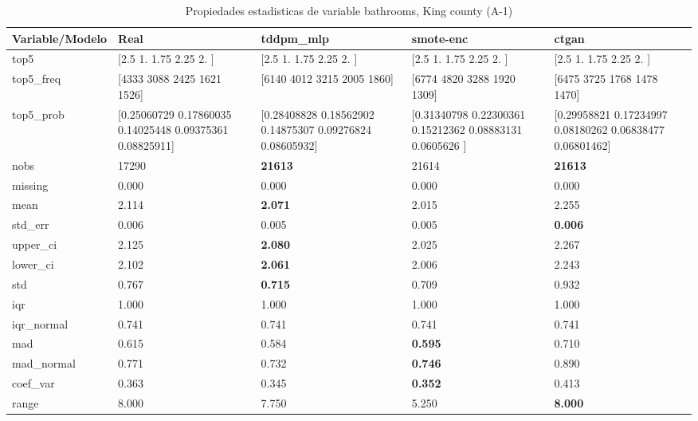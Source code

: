 \begin{table}[H]
\centering
\fontsize{8}{14}\selectfont
\caption{Propiedades  estadisticas de variable bathrooms, King county (A-1)}
\label{table-stats-king county-a-1-bathrooms}
\begin{tabular}{|l|m{10em}|m{10em}|m{10em}|m{10em}|}
\hline
 \rowcolor[gray]{0.8}
Variable/Modelo & Real & tddpm\_mlp & smote-enc & ctgan \\
\hline top5 & [2.5  1.   1.75 2.25 2.  ] & [2.5  1.   1.75 2.25 2.  ] & [2.5  1.   1.75 2.25 2.  ] & [2.5  1.   1.75 2.25 2.  ] \\
\hline top5\_freq & [4333 3088 2425 1621 1526] & [6140 4012 3215 2005 1860] & [6774 4820 3288 1920 1309] & [6475 3725 1768 1478 1470] \\
\hline top5\_prob & [0.25060729 0.17860035 0.14025448 0.09375361 0.08825911] & [0.28408828 0.18562902 0.14875307 0.09276824 0.08605932] & [0.31340798 0.22300361 0.15212362 0.08883131 0.0605626 ] & [0.29958821 0.17234997 0.08180262 0.06838477 0.06801462] \\
\hline nobs & 17290 & \bfseries 21613 & \cellcolor[rgb]{0.9, 0.54, 0.52} 21614 & \bfseries 21613 \\
\hline missing & 0.000 & 0.000 & 0.000 & 0.000 \\
\hline mean & 2.114 & \bfseries 2.071 & 2.015 & \cellcolor[rgb]{0.9, 0.54, 0.52} 2.255 \\
\hline std\_err & 0.006 & 0.005 & \cellcolor[rgb]{0.9, 0.54, 0.52} 0.005 & \bfseries 0.006 \\
\hline upper\_ci & 2.125 & \bfseries 2.080 & 2.025 & \cellcolor[rgb]{0.9, 0.54, 0.52} 2.267 \\
\hline lower\_ci & 2.102 & \bfseries 2.061 & 2.006 & \cellcolor[rgb]{0.9, 0.54, 0.52} 2.243 \\
\hline std & 0.767 & \bfseries 0.715 & 0.709 & \cellcolor[rgb]{0.9, 0.54, 0.52} 0.932 \\
\hline iqr & 1.000 & 1.000 & 1.000 & 1.000 \\
\hline iqr\_normal & 0.741 & 0.741 & 0.741 & 0.741 \\
\hline mad & 0.615 & 0.584 & \bfseries 0.595 & \cellcolor[rgb]{0.9, 0.54, 0.52} 0.710 \\
\hline mad\_normal & 0.771 & 0.732 & \bfseries 0.746 & \cellcolor[rgb]{0.9, 0.54, 0.52} 0.890 \\
\hline coef\_var & 0.363 & 0.345 & \bfseries 0.352 & \cellcolor[rgb]{0.9, 0.54, 0.52} 0.413 \\
\hline range & 8.000 & 7.750 & \cellcolor[rgb]{0.9, 0.54, 0.52} 5.250 & \bfseries 8.000 \\

\end{tabular}
\end{table}
